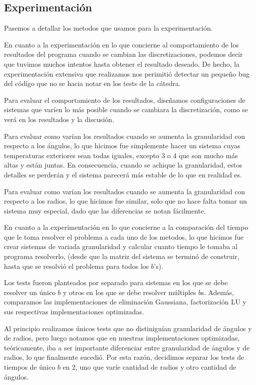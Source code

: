 \subsection{Experimentación}

Pasemos a detallar los metodos que usamos para la experimentación.



En cuanto a la experimentación en lo que concierne al comportamiento de los resultados del programa cuando se cambian las discretizaciones, podemos decir que tuvimos muchos intentos hasta obtener el resultado deseado. De hecho, la experimentación extensiva que realizamos nos perimitió detectar un pequeño bug del código que no se hacia notar en los tests de la cátedra.

Para evaluar el comportamiento de los resultados, diseñamos configuraciones de sistemas que varíen lo más posible cuando se cambiara la discretización, como se verá en los resultados y la discusión.

Para evaluar como varían los resultados cuando se aumenta la granularidad con respecto a los ángulos, lo que hicimos fue simplemente hacer un sistema cuyas temperaturas exteriores sean todas iguales, excepto 3 o 4 que son mucho más altas y están juntas. En consecuencia, cuando se achique la granularidad, estos detalles se perderán y el sistema parecerá más estable de lo que en realidad es.

Para evaluar como varían los resultados cuando se aumenta la granularidad con respecto a los radios, lo que hicimos fue similar, solo que no hace falta tomar un sistema muy especial, dado que las diferencias se notan fácilmente.



En cuanto a la experimentación en lo que concierne a la comparación del tiempo que le toma resolver el problema a cada uno de los metodos, lo que hicimos fue crear sistemas de variada granularidad y calcular cuanto tiempo le tomaba al programa resolverlo, (desde que la matriz del sistema se terminó de construir, hasta que se resolvió el problema para todos los $b$'s).

Los tests fueron planteados por separado para sistemas en los que se debe resolver un único $b$ y otros en los que se debe resolver múltiples $b$s. Además, comparamos las implementaciones de eliminación Gaussiana, factorización LU y sus respectivas implementaciones optimizadas.

Al principio realizamos únicos tests que no distiniguían granularidad de ángulos y de radios, pero luego notamos que en nuestras implementaciones optimizadas, teóricamente, iba a ser importante diferenciar entre granularidad de ángulos y de radios, lo que finalmente sucedió. Por esta razón, decidimos separar los tests de tiempos de único $b$ en 2, uno que varíe cantidad de radios y otro cantidad de ángulos.


